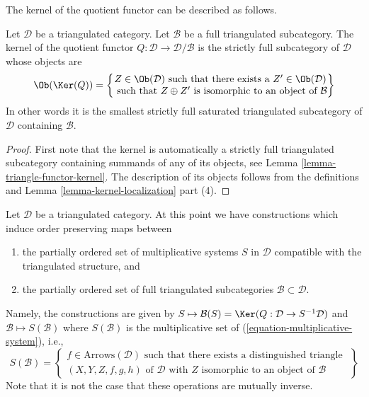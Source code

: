 \noindent
The kernel of the quotient functor can be described as follows.

\begin{lemma}
\label{lemma-kernel-quotient}
Let $\mathcal{D}$ be a triangulated category.
Let $\mathcal{B}$ be a full triangulated subcategory.
The kernel of the quotient functor
$Q : \mathcal{D} \to \mathcal{D}/\mathcal{B}$
is the strictly full subcategory of $\mathcal{D}$ whose objects are
$$
\Ob(\Ker(Q)) =
\left\{
\begin{matrix}
Z \in \Ob(\mathcal{D})
\text{ such that there exists a }Z' \in \Ob(\mathcal{D}) \\
\text{ such that }Z \oplus Z'\text{ is isomorphic to an object of }\mathcal{B}
\end{matrix}
\right\}
$$
In other words it is the smallest strictly full saturated triangulated
subcategory of $\mathcal{D}$ containing $\mathcal{B}$.
\end{lemma}

\begin{proof}
First note that the kernel is automatically a strictly full
triangulated subcategory containing summands of any of its objects, see
Lemma \ref{lemma-triangle-functor-kernel}.
The description of its objects follows from the definitions and
Lemma \ref{lemma-kernel-localization} part (4).
\end{proof}

\noindent
Let $\mathcal{D}$ be a triangulated category.
At this point we have constructions which induce order
preserving maps between
\begin{enumerate}
\item the partially ordered set of multiplicative systems $S$ in $\mathcal{D}$
compatible with the triangulated structure, and
\item the partially ordered set of full triangulated subcategories
$\mathcal{B} \subset \mathcal{D}$.
\end{enumerate}
Namely, the constructions are given by
$S \mapsto \mathcal{B}(S) = \Ker(Q : \mathcal{D} \to S^{-1}\mathcal{D})$
and $\mathcal{B} \mapsto S(\mathcal{B})$
where $S(\mathcal{B})$ is the multiplicative set of
(\ref{equation-multiplicative-system}), i.e.,
$$
S(\mathcal{B}) =
\left\{
\begin{matrix}
f \in \text{Arrows}(\mathcal{D})
\text{ such that there exists a distinguished triangle }\\
(X, Y, Z, f, g, h) \text{ of }\mathcal{D}\text{ with }
Z\text{ isomorphic to an object of }\mathcal{B}
\end{matrix}
\right\}
$$
Note that it is not the case that these operations are mutually inverse.

